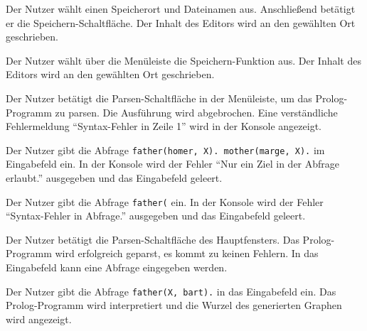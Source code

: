\documentclass[parskip=full,11pt,twoside]{scrartcl}
\begin{document}
{Der Nutzer wählt einen Speicherort und Dateinamen aus. Anschließend betätigt er die Speichern-Schaltfläche.}
{Der Inhalt des Editors wird an den gewählten Ort geschrieben.}


{Der Nutzer wählt über die Menüleiste die Speichern-Funktion aus.}
{Der Inhalt des Editors wird an den gewählten Ort geschrieben.}


{Der Nutzer betätigt die Parsen-Schaltfläche in der Menüleiste, um das Prolog-Programm zu parsen.}
{Die Ausführung wird abgebrochen. Eine verständliche Fehlermeldung \enquote{Syntax-Fehler in Zeile 1} wird in der Konsole angezeigt.}


{Der Nutzer gibt die Abfrage \texttt{father(homer, X). mother(marge, X).} im Eingabefeld ein.}
{In der Konsole wird der Fehler \enquote{Nur ein Ziel in der Abfrage erlaubt.} ausgegeben und das Eingabefeld geleert.}


{Der Nutzer gibt die Abfrage \texttt{father(} ein.}
{In der Konsole wird der Fehler \enquote{Syntax-Fehler in Abfrage.} ausgegeben und das Eingabefeld geleert.}


{Der Nutzer betätigt die Parsen-Schaltfläche des Hauptfensters.}
{Das Prolog-Programm wird erfolgreich geparst, es kommt zu keinen Fehlern. In das Eingabefeld kann eine Abfrage eingegeben werden.}

{Der Nutzer gibt die Abfrage \texttt{father(X, bart).} in das Eingabefeld ein.}
{Das Prolog-Programm wird interpretiert und die Wurzel des generierten Graphen wird angezeigt.}
\end{document}
